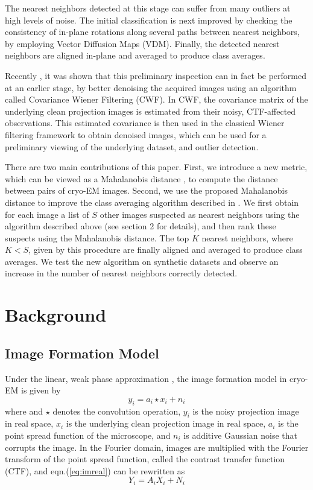 \documentclass{article}
\begin{document}
The nearest neighbors detected at this stage can suffer from many outliers at high levels of noise. The initial classification is next improved by checking the consistency of in-plane rotations along several paths between nearest neighbors, by employing Vector Diffusion Maps (VDM)\cite{vdm}. Finally, the detected nearest neighbors are aligned in-plane and averaged to produce class averages. 

Recently \cite{cwf}, it was shown that this preliminary inspection can in fact be performed at an earlier stage, by better denoising the acquired images using an algorithm called Covariance Wiener Filtering (CWF). In CWF, the covariance matrix of the underlying clean projection images is estimated from their noisy, CTF-affected observations. This estimated covariance is then used in the classical Wiener filtering framework to obtain denoised images, which can be used for a preliminary viewing of the underlying dataset, and outlier detection. 

There are two main contributions of this paper. First, we introduce a new metric, which can be viewed as a Mahalanobis distance \cite{mah}, to compute the distance between pairs of cryo-EM images. Second, we use the proposed Mahalanobis distance to improve the class averaging algorithm described in \cite{zhao}. We first obtain for each image a list of $S$ other images suspected as nearest neighbors using the algorithm described above (see section 2 for details), and then rank these suspects using the Mahalanobis distance. The top $K$ nearest neighbors, where $K<S$, given by this procedure are finally aligned and averaged to produce class averages. We test the new algorithm on synthetic datasets and observe an increase in the number of nearest neighbors correctly detected.

\section{Background}
\subsection{Image Formation Model}
Under the linear, weak phase approximation \cite{frankbook}, the image formation model in cryo-EM is given by
\begin{equation}
y_i = a_i\star x_i + n_i
\label{eq:imreal}
\end{equation}
where and $\star$ denotes the convolution operation, $y_i$ is the noisy projection image in real space, $x_i$ is the underlying clean projection image in real space, $a_i$ is the point spread function of the microscope, and $n_i$ is additive Gaussian noise that corrupts the image. In the Fourier domain, images are multiplied with the Fourier transform of the point spread function, called the contrast transfer function (CTF), and eqn.(\ref{eq:imreal}) can be rewritten as
\begin{equation}
Y_i = A_iX_i + N_i
\label{eq:imfour}
\end{equation}
\end{document}
